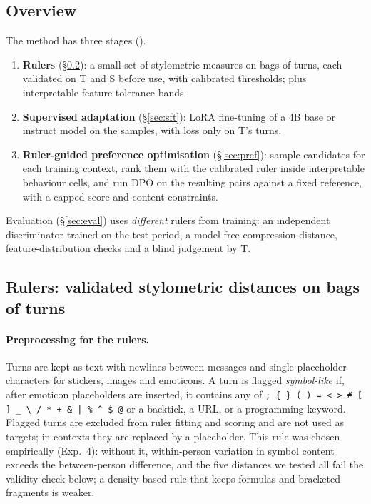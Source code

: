 \subsection{Overview}
\label{sec:overview}

The method has three stages ().
\begin{enumerate}
\item \textbf{Rulers} (\S\ref{sec:rulers}): a small set of stylometric measures on bags of turns, each validated on T and S before use, with calibrated thresholds; plus interpretable feature tolerance bands.
\item \textbf{Supervised adaptation} (\S\ref{sec:sft}): LoRA fine-tuning \citep{hu2022lora} of a 4B base or instruct model on the samples, with loss only on T's turns.
\item \textbf{Ruler-guided preference optimisation} (\S\ref{sec:pref}): sample candidates for each training context, rank them with the calibrated ruler inside interpretable behaviour cells, and run DPO \citep{rafailov2023dpo} on the resulting pairs against a fixed reference, with a capped score and content constraints.
\end{enumerate}
Evaluation (\S\ref{sec:eval}) uses \emph{different} rulers from training: an independent discriminator trained on the test period, a model-free compression distance, feature-distribution checks and a blind judgement by T.

\subsection{Rulers: validated stylometric distances on bags of turns}
\label{sec:rulers}

\paragraph{Preprocessing for the rulers.}
Turns are kept as text with newlines between messages and single placeholder characters for stickers, images and emoticons.
A turn is flagged \emph{symbol-like} if, after emoticon placeholders are inserted, it contains any of \verb!; { } ( ) = < > # [ ] _ \ / * + & | % ^ $ @! or a backtick, a URL, or a programming keyword.
Flagged turns are excluded from ruler fitting and scoring and are not used as targets; in contexts they are replaced by a placeholder.
This rule was chosen empirically (Exp.~4): without it, within-person variation in symbol content exceeds the between-person difference, and the five distances we tested all fail the validity check below; a density-based rule that keeps formulas and bracketed fragments is weaker.

